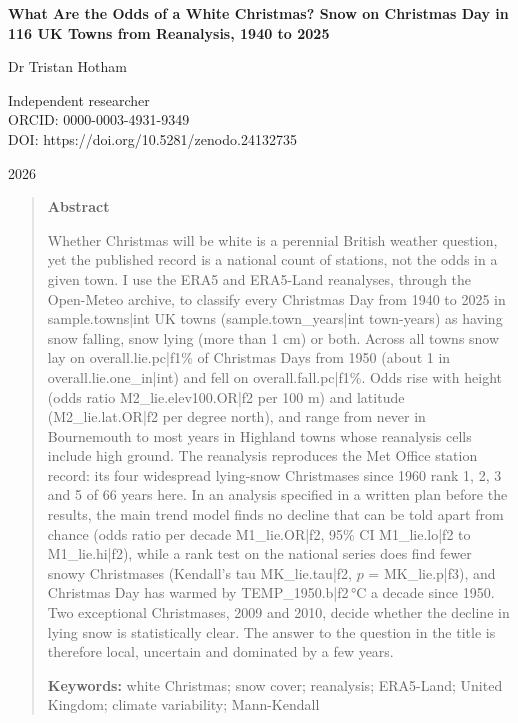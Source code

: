 \documentclass[11pt,a4paper]{article}
\begin{document}
\begin{center}
{\Large\bfseries What Are the Odds of a White Christmas? Snow on Christmas Day in 116 UK Towns from Reanalysis, 1940 to 2025\par}
\vspace{1.2em}
{\large Dr Tristan Hotham\par}
\vspace{0.3em}
{\small Independent researcher\\
ORCID: 0000-0003-4931-9349\\
DOI: https://doi.org/10.5281/zenodo.24132735\par}
\vspace{0.8em}
2026
\end{center}

\begin{quote}
\small
\begin{center}\textbf{Abstract}\end{center}
Whether Christmas will be white is a perennial British weather question, yet the published record is a national count of stations, not the odds in a given town. I use the ERA5 and ERA5-Land reanalyses, through the Open-Meteo archive, to classify every Christmas Day from 1940 to 2025 in {{sample.towns|int}} UK towns ({{sample.town_years|int}} town-years) as having snow falling, snow lying (more than 1 cm) or both. Across all towns snow lay on {{overall.lie.pc|f1}}\% of Christmas Days from 1950 (about 1 in {{overall.lie.one_in|int}}) and fell on {{overall.fall.pc|f1}}\%. Odds rise with height (odds ratio {{M2_lie.elev100.OR|f2}} per 100 m) and latitude ({{M2_lie.lat.OR|f2}} per degree north), and range from never in Bournemouth to most years in Highland towns whose reanalysis cells include high ground. The reanalysis reproduces the Met Office station record: its four widespread lying-snow Christmases since 1960 rank 1, 2, 3 and 5 of 66 years here. In an analysis specified in a written plan before the results, the main trend model finds no decline that can be told apart from chance (odds ratio per decade {{M1_lie.OR|f2}}, 95\% CI {{M1_lie.lo|f2}} to {{M1_lie.hi|f2}}), while a rank test on the national series does find fewer snowy Christmases (Kendall's tau {{MK_lie.tau|f2}}, $p$ = {{MK_lie.p|f3}}), and Christmas Day has warmed by {{TEMP_1950.b|f2}}\,°C a decade since 1950. Two exceptional Christmases, 2009 and 2010, decide whether the decline in lying snow is statistically clear. The answer to the question in the title is therefore local, uncertain and dominated by a few years.

\textbf{Keywords:} white Christmas; snow cover; reanalysis; ERA5-Land; United Kingdom; climate variability; Mann-Kendall
\end{quote}
\end{document}
